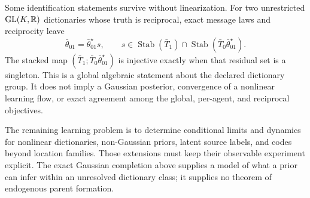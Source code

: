 Some identification statements survive without linearization. For two unrestricted $\mathrm{GL}(K,\mathbb R)$ dictionaries whose truth is reciprocal, exact message laws and reciprocity leave
\begin{equation}
\bar\theta_{01}=\bar\theta^\star_{01}s,\qquad
s\in\operatorname{Stab}(\bar T_1)
\cap\operatorname{Stab}(\bar T_0\bar\theta^\star_{01}).
\end{equation}
The stacked map $(\bar T_1;\bar T_0\bar\theta^\star_{01})$ is injective exactly when that residual set is a singleton. This is a global algebraic statement about the declared dictionary group. It does not imply a Gaussian posterior, convergence of a nonlinear learning flow, or exact agreement among the global, per-agent, and reciprocal objectives.

The remaining learning problem is to determine conditional limits and dynamics for nonlinear dictionaries, non-Gaussian priors, latent source labels, and codes beyond location families. Those extensions must keep their observable experiment explicit. The exact Gaussian completion above supplies a model of what a prior can infer within an unresolved dictionary class; it supplies no theorem of endogenous parent formation.
